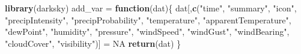 \documentclass[12pt]{book}
\newenvironment{Shaded}{\begin{snugshade}}{\end{snugshade}}
\newcommand{\ControlFlowTok}[1]{\textcolor[rgb]{0.13,0.29,0.53}{\textbf{#1}}}
\newcommand{\KeywordTok}[1]{\textcolor[rgb]{0.13,0.29,0.53}{\textbf{#1}}}
\newcommand{\NormalTok}[1]{#1}
\newcommand{\OtherTok}[1]{\textcolor[rgb]{0.56,0.35,0.01}{#1}}
\newcommand{\StringTok}[1]{\textcolor[rgb]{0.31,0.60,0.02}{#1}}
\numberwithin{equation}{chapter}
\begin{document}
\begin{Shaded}
\begin{Highlighting}[]
\KeywordTok{library}\NormalTok{(darksky)}
\NormalTok{add_var =}\StringTok{ }\ControlFlowTok{function}\NormalTok{(dat)\{}
\NormalTok{  dat[,}\KeywordTok{c}\NormalTok{(}\StringTok{"time"}\NormalTok{, }\StringTok{"summary"}\NormalTok{, }\StringTok{"icon"}\NormalTok{, }\StringTok{"precipIntensity"}\NormalTok{, }
         \StringTok{"precipProbability"}\NormalTok{, }\StringTok{"temperature"}\NormalTok{, }\StringTok{"apparentTemperature"}\NormalTok{, }
         \StringTok{"dewPoint"}\NormalTok{, }\StringTok{"humidity"}\NormalTok{, }\StringTok{"pressure"}\NormalTok{, }\StringTok{"windSpeed"}\NormalTok{, }\StringTok{"windGust"}\NormalTok{, }
         \StringTok{"windBearing"}\NormalTok{, }\StringTok{"cloudCover"}\NormalTok{, }\StringTok{"visibility"}\NormalTok{)] =}\StringTok{ }\OtherTok{NA}
  \KeywordTok{return}\NormalTok{(dat)}
\NormalTok{\}}


\end{Highlighting}
\end{Shaded}
\end{document}
